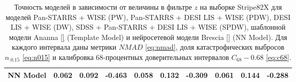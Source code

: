 \documentclass[fleqn,usenatbib]{mnras}
\begin{document}
\begin{table}
\begin{tabular}{llllllllll}
            NN Model       &                        0.062 &           0.092 &          -0.463 &                                0.058 &           0.132 &          -0.309 &                                  0.061 &           0.144 &          -0.288 \\
            \hline
            \end{tabular}
            \caption{Точность моделей в зависимости от величины в фильтре $z$ на выборке Stripe82X для моделей Pan-STARRS + WISE (PW), Pan-STARRS + DESI LIS + WISE (PDW), DESI LIS + WISE (DW), SDSS + Pan-STARRS + DESI LIS + WISE (SPDW), шаблонной модели Ananna \ref{} (Template Model) и нейросетевой модели Brescia \ref{} (NN Model). Для каждого интервала даны метрики $NMAD$ \eqref{eq:nmad}, доля катастрофических выбросов $n_{.0.15}$ \eqref{eq:n015} и калибровка 68-процентных доверительных интервалов $C_{68} - 0.68$ \eqref{eq:c68}.}
\end{table}
\end{document}
